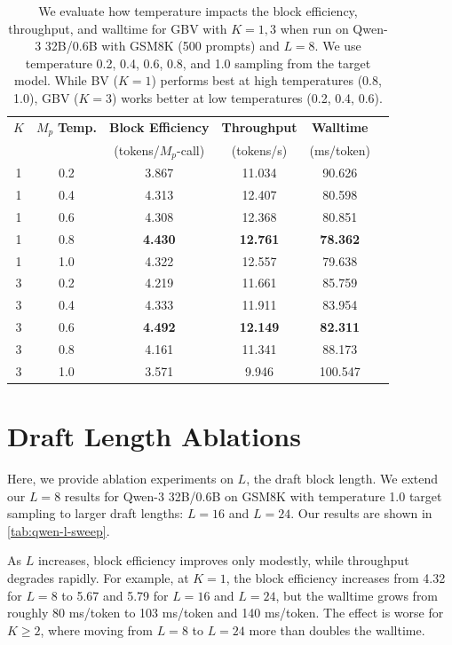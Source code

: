 \documentclass{article}
\theoremstyle{plain}
\theoremstyle{definition}
\theoremstyle{remark}
\begin{document}
\begin{table}[htbp]
\centering
\begin{tabular}{@{}cccccc@{}}
\toprule
$K$ & $M_p$\textbf{ Temp.} & \textbf{Block Efficiency} & \textbf{Throughput} & \textbf{Walltime} \\
& & (tokens/$M_p$-call) & (tokens/s) & (ms/token) \\
\midrule
1 & 0.2 & 3.867 & 11.034 & 90.626 \\
1 & 0.4 & 4.313 & 12.407 & 80.598 \\
1 & 0.6 & 4.308 & 12.368 & 80.851 \\
1 & 0.8 & \textbf{4.430} & \textbf{12.761} & \textbf{78.362} \\
1 & 1.0 & 4.322 & 12.557 & 79.638 \\
\midrule
3 & 0.2 & 4.219 & 11.661 & 85.759 \\
3 & 0.4 & 4.333 & 11.911 & 83.954 \\
3 & 0.6 & \textbf{4.492} & \textbf{12.149} & \textbf{82.311} \\
3 & 0.8 & 4.161 & 11.341 & 88.173 \\
3 & 1.0 & 3.571 & 9.946  & 100.547 \\
\bottomrule
\end{tabular}
\caption{We evaluate how temperature impacts the block efficiency, throughput, and walltime for GBV with $K=1,3$ when run on Qwen-3 32B/0.6B with GSM8K (500 prompts) and $L=8$. We use temperature 0.2, 0.4, 0.6, 0.8, and 1.0 sampling from the target model. While BV ($K=1$) performs best at high temperatures (0.8, 1.0), GBV ($K=3$) works better at low temperatures (0.2, 0.4, 0.6).}
\label{tab:qwen-temp-sweep}
\end{table}



\section{Draft Length Ablations}
\label{appendix:L-ablation}

Here, we provide ablation experiments on $L$, the draft block length. We extend our $L=8$ results for Qwen-3 32B/0.6B on GSM8K with temperature 1.0 target sampling to larger draft lengths: $L=16$ and $L=24$. Our results are shown in \cref{tab:qwen-l-sweep}.

As $L$ increases, block efficiency improves only modestly, while throughput degrades rapidly. For example, at $K=1$, the block efficiency increases from 4.32 for $L=8$ to 5.67 and 5.79 for $L=16$ and $L=24$, but the walltime grows from roughly 80 ms/token to 103 ms/token and 140 ms/token. The effect is worse for $K \geq 2$, where moving from $L=8$ to $L=24$ more than doubles the walltime. 
\end{document}
